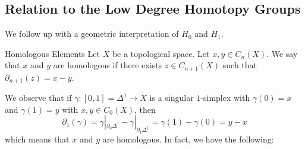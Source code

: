 \documentclass[a4paper]{article}
\begin{document}
\subsection{Relation to the Low Degree Homotopy Groups}
We follow up with a geometric interpretation of $H_0$ and $H_1$. 

\begin{defn}{Homologous Elements}{} Let $X$ be a topological space. Let $x,y\in C_n(X)$. We say that $x$ and $y$ are homologous if there exists $z\in C_{n+1}(X)$ such that $\partial_{n+1}(z)=x-y$. 
\end{defn}

We observe that if $\gamma:[0,1]=\Delta^1\to X$ is a singular $1$-simplex with $\gamma(0)=x$ and $\gamma(1)=y$ with $x,y\in C_0(X)$, then $$\partial_1(\gamma)=\gamma|_{\partial_0\Delta^1}-\gamma|_{\partial_1\Delta^1}=\gamma(1)-\gamma(0)=y-x$$ which means that $x$ and $y$ are homologous. In fact, we have the following: 
\end{document}

